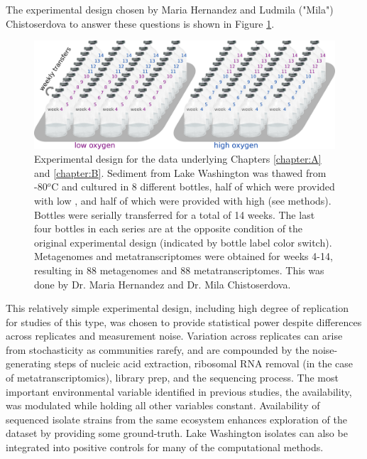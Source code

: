 The experimental design chosen by Maria Hernandez and Ludmila ("Mila") Chistoserdova to answer these questions is shown in Figure \ref{fig:experimental_design}.

\begin{figure}[H]
\centering
    \includegraphics[width=1.0\textwidth]{./tex/chapter2/figures/170311_experimental_design_meta4--2_colors.png}
    \begin{singlespace}
    \caption[Experimental design for the data underlying Chapters \ref{chapter:A} and \ref{chapter:B}]{
	Experimental design for the data underlying Chapters \ref{chapter:A} and \ref{chapter:B}.
	Sediment from Lake Washington was thawed from -80$^o$C and cultured in 8 different bottles,
        half of which were provided with low , and half of which were provided with high  (see methods).
        Bottles were serially transferred for a total of 14 weeks.
        The last four bottles in each series are at the opposite  condition of the original experimental design
        (indicated by bottle label color switch).
        Metagenomes and metatranscriptomes were obtained for weeks 4-14, resulting in 88 metagenomes and 88 metatranscriptomes.
        This was done by Dr. Maria Hernandez and Dr. Mila Chistoserdova.
	   }
    \label{fig:experimental_design}
    \end{singlespace}
\end{figure}

This relatively simple experimental design, including high degree of replication for studies of this type, was chosen to provide statistical power despite differences across replicates and measurement noise.
Variation across replicates can arise from stochasticity as communities rarefy, and are compounded by the noise-generating steps of nucleic acid extraction, ribosomal RNA removal (in the case of metatranscriptomics), library prep, and the sequencing process.
The most important environmental variable identified in previous studies, the  availability, was modulated while holding all other variables constant.
Availability of sequenced isolate strains from the same ecosystem enhances exploration of the dataset by providing some ground-truth.
Lake Washington isolates can also be integrated into positive controls for many of the computational methods.

